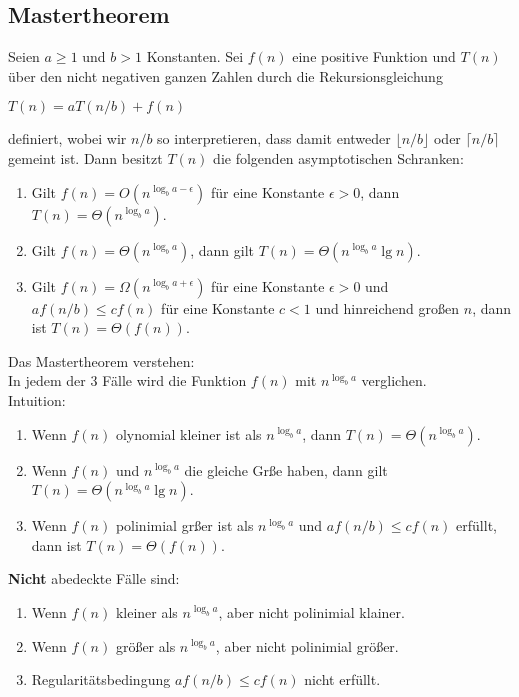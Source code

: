 	\subsection{Mastertheorem}
			Seien $a \geq 1$ und $b > 1$ Konstanten. Sei $f(n)$ eine positive Funktion und $T(n)$
			über den nicht negativen ganzen Zahlen durch die Rekursionsgleichung
			\begin{center}
				$T(n) = aT(n/b) + f(n)$
			\end{center}
			definiert, wobei wir $n/b$ so interpretieren, dass damit entweder $\lfloor n / b \rfloor$
			oder $\lceil n/b \rceil$ gemeint ist. Dann besitzt $T(n)$ die folgenden asymptotischen Schranken:
			\begin{enumerate}
				\item Gilt $f(n) = O(n^{\log_b a-\epsilon})$ für eine Konstante $\epsilon > 0$, dann $T(n) = \Theta (n^{\log_b a})$.
				\item Gilt $f(n) = \Theta (n^{\log_b a})$, dann gilt $T(n) = \Theta (n^{\log_b a} \lg n)$.
				\item Gilt $f(n) = \Omega (n^{\log_b a+\epsilon})$ für eine Konstante $\epsilon > 0$ und $af(n/b) \leq cf(n)$
					für eine Konstante $c < 1$ und hinreichend gro\ss en $n$, dann ist $T(n) = \Theta (f(n))$.
			\end{enumerate} 
			Das Mastertheorem verstehen: \\
			In jedem der 3 Fälle wird die Funktion $f(n)$ mit $n^{\log_b a}$ verglichen. \\
			Intuition:  
			\begin{enumerate}
				\item Wenn $f(n)$ olynomial kleiner ist als $n^{\log_b a}$, dann $T(n) = \Theta (n^{\log_b a})$.
				\item Wenn $f(n)$ und $n^{\log_b a}$ die gleiche Gr\ss e haben, dann gilt $T(n) = \Theta (n^{\log_b a} \lg n)$.
				\item Wenn $f(n)$ polinimial gr\ss er ist als $n^{\log_b a}$ und $af(n/b) \leq cf(n)$ erfüllt, dann ist $T(n) = \Theta (f(n))$.
			\end{enumerate}
			\textbf{Nicht} abedeckte Fälle sind:
			\begin{enumerate}
				\item Wenn $f(n)$ kleiner als $n^{\log_b a}$, aber nicht polinimial klainer.
				\item Wenn $f(n)$ grö\ss er als $n^{\log_b a}$, aber nicht polinimial grö\ss er.
				\item Regularitätsbedingung $af(n/b) \leq cf(n)$ nicht erfüllt.
			\end{enumerate}

